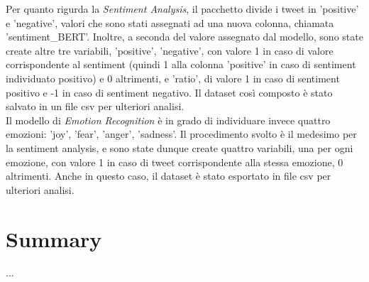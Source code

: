 \documentclass[12pt,journal,compsoc]{IEEEtran}
\begin{document}


Per quanto rigurda la \textit{Sentiment Analysis}, il pacchetto divide i tweet in 'positive' e 'negative', valori che sono stati assegnati ad una nuova colonna, chiamata 'sentiment\_BERT'. Inoltre, a seconda del valore assegnato dal modello, sono state create altre tre variabili, 'positive', 'negative', con valore 1 in caso di valore corrispondente al sentiment (quindi 1 alla colonna 'positive' in caso di sentiment individuato positivo) e 0 altrimenti, e 'ratio', di valore 1 in caso di sentiment positivo e -1 in caso di sentiment negativo. Il dataset così composto è stato salvato in un file csv per ulteriori analisi.\\
Il modello di \textit{Emotion Recognition} è in grado di individuare invece quattro emozioni: 'joy', 'fear', 'anger', 'sadness'. Il procedimento svolto è il medesimo per la sentiment analysis, e sono state dunque create quattro variabili, una per ogni emozione, con valore 1 in caso di tweet corrispondente alla stessa emozione, 0 altrimenti. Anche in questo caso, il dataset è stato esportato in file csv per ulteriori analisi.

\section{Summary}
...




\nocite{*}
\printbibliography
\end{document}
